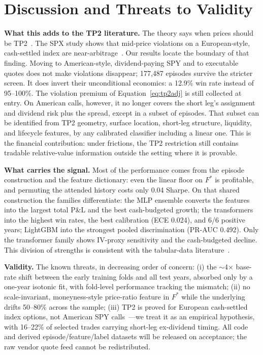 \documentclass[sigconf,review,anonymous]{acmart}
\begin{document}
\section{Discussion and Threats to Validity}
\label{sec:limitations}

\noindent\textbf{What this adds to the TP2 literature.} The theory says when prices should be TP2~\cite{glasserman2026tp2theory}. The SPX study shows that mid-price violations on a European-style, cash-settled index are near-arbitrage~\cite{glasserman2025tp2}. Our results locate the boundary of that finding. Moving to American-style, dividend-paying SPY and to executable quotes does not make violations disappear; 177{,}487 episodes survive the stricter screen. It does invert their unconditional economics: a 12.9\% win rate instead of 95--100\%. The violation premium of Equation~\eqref{eq:tp2adj} is still collected at entry. On American calls, however, it no longer covers the short leg's assignment and dividend risk plus the spread, except in a subset of episodes. That subset can be identified from TP2 geometry, surface location, short-leg structure, liquidity, and lifecycle features, by any calibrated classifier including a linear one. This is the financial contribution: under frictions, the TP2 restriction still contains tradable relative-value information outside the setting where it is provable.

\noindent\textbf{What carries the signal.} Most of the performance comes from the episode construction and the feature dictionary: even the linear floor on $F^{\ast}$ is profitable, and permuting the attended history costs only 0.04 Sharpe. On that shared construction the families differentiate: the MLP ensemble converts the features into the largest total P\&L and the best cash-budgeted growth; the transformers into the highest win rates, the best calibration (ECE 0.024), and 6/6 positive years; LightGBM into the strongest pooled discrimination (PR-AUC 0.492). Only the transformer family shows IV-proxy sensitivity and the cash-budgeted decline. This division of strengths is consistent with the tabular-data literature~\cite{grinsztajn2022why,gorishniy2021revisiting}.

\noindent\textbf{Validity.} The known threats, in decreasing order of concern: (i) the $\sim$4$\times$ base-rate shift between the early training folds and all test years, absorbed only by a one-year isotonic fit, with fold-level performance tracking the mismatch; (ii) no scale-invariant, moneyness-style price-ratio feature in $F^{\ast}$ while the underlying drifts 50--80\% across the sample; (iii) TP2 is proved for European cash-settled index options, not American SPY calls~\cite{glasserman2026tp2theory,cosma2020earlyexercise}---we treat it as an empirical hypothesis, with 16--22\% of selected trades carrying short-leg ex-dividend timing. All code and derived episode/feature/label datasets will be released on acceptance; the raw vendor quote feed cannot be redistributed.
\end{document}
